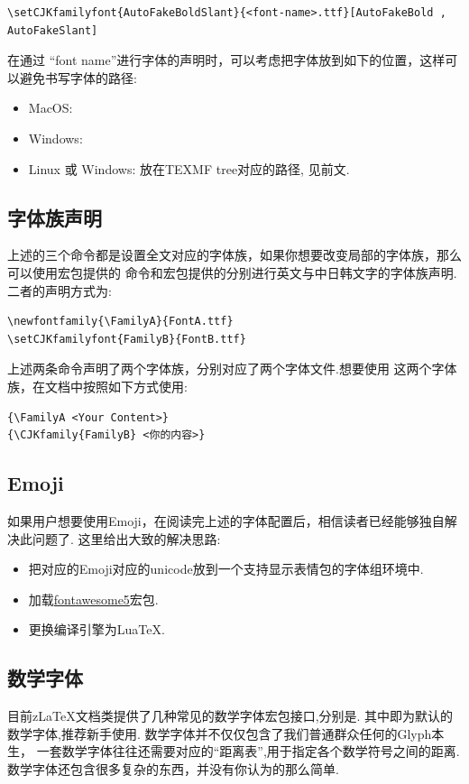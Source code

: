 \begin{verbatim}
\setCJKfamilyfont{AutoFakeBoldSlant}{<font-name>.ttf}[AutoFakeBold , AutoFakeSlant]
\end{verbatim}

在通过 ``font name''进行字体的声明时，可以考虑把字体放到如下的位置，这样可以避免书写字体的路径:
\begin{itemize}
    \item MacOS:
    \item Windows:
    \item Linux 或 Windows: 放在TEXMF tree对应的路径, 见前文.
\end{itemize}

\subsection{字体族声明}
上述的三个命令都是设置全文对应的字体族，如果你想要改变局部的字体族，那么可以使用宏包提供的
命令\cmd{\newfontfamily}和宏包提供的\cmd{\setCJKfamilyfont}分别进行英文与中日韩文字的字体族声明.
二者的声明方式为:
\begin{verbatim}
\newfontfamily{\FamilyA}{FontA.ttf}
\setCJKfamilyfont{FamilyB}{FontB.ttf}
\end{verbatim}

上述两条命令声明了两个字体族，分别对应了两个字体文件.想要使用
这两个字体族，在文档中按照如下方式使用:
\begin{verbatim}
{\FamilyA <Your Content>}
{\CJKfamily{FamilyB} <你的内容>}
\end{verbatim}

\subsection{Emoji}
如果用户想要使用Emoji，在阅读完上述的字体配置后，相信读者已经能够独自解决此问题了. 这里给出大致的解决思路:
\begin{itemize}
    \item 把对应的Emoji对应的unicode放到一个支持显示表情包的字体组环境中.
    \item 加载\href{http://mirrors.ctan.org/fonts/fontawesome5/doc/fontawesome5.pdf}{fontawesome5}宏包.
    \item 更换编译引擎为Lua\TeX.
\end{itemize}


\subsection{数学字体}
目前z\LaTeX{}文档类提供了几种常见的数学字体宏包接口,分别是. 
其中即为默认的数学字体,推荐新手使用. 数学字体并不仅仅包含了我们普通群众任何的Glyph本生，
一套数学字体往往还需要对应的``距离表'',用于指定各个数学符号之间的距离. 数学字体还包含很多复杂的东西，并没有你认为的那么简单.

